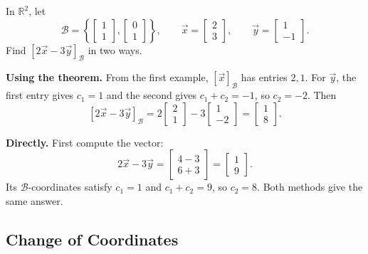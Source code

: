 \begin{example}
In $\mathbb{R}^2$, let
\[
\mathcal{B} = \left\{ \begin{bmatrix} 1 \\ 1 \end{bmatrix}, \begin{bmatrix} 0 \\ 1 \end{bmatrix} \right\},
\qquad
\vec{x} = \begin{bmatrix} 2 \\ 3 \end{bmatrix}, \qquad \vec{y} = \begin{bmatrix} 1 \\ -1 \end{bmatrix}.
\]
Find $[2\vec{x} - 3\vec{y}]_{\mathcal{B}}$ in two ways.

\begin{solution}
\textbf{Using the theorem.} From the first example, $[\vec{x}]_{\mathcal{B}}$ has entries $2, 1$. For $\vec{y}$, the first entry gives $c_1 = 1$ and the second gives $c_1 + c_2 = -1$, so $c_2 = -2$. Then
\[
[2\vec{x} - 3\vec{y}]_{\mathcal{B}} = 2\begin{bmatrix} 2 \\ 1 \end{bmatrix} - 3\begin{bmatrix} 1 \\ -2 \end{bmatrix} = \begin{bmatrix} 1 \\ 8 \end{bmatrix}.
\]

\textbf{Directly.} First compute the vector:
\[
2\vec{x} - 3\vec{y} = \begin{bmatrix} 4 - 3 \\ 6 + 3 \end{bmatrix} = \begin{bmatrix} 1 \\ 9 \end{bmatrix}.
\]
Its $\mathcal{B}$-coordinates satisfy $c_1 = 1$ and $c_1 + c_2 = 9$, so $c_2 = 8$. Both methods give the same answer.
\end{solution}
\end{example}

\subsection{Change of Coordinates}

